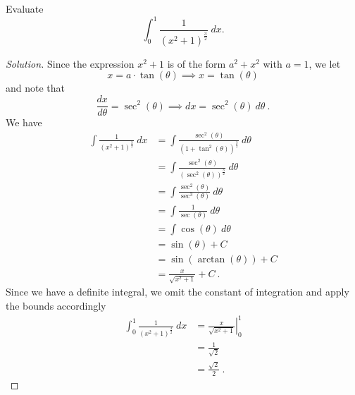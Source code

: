 \documentclass[compacto,10pt,comentarios]{aleph-notas}
\begin{document}
\begin{ejer}
    Evaluate
    $$
        \int_{0}^{1} \frac{1}{(x^{2} + 1)^{\frac{3}{2}}} ~ dx.
    $$
\end{ejer}
\begin{proof}[Solution]
    Since the expression $x^{2} + 1$ is of the form $a^{2} + x^{2}$ with $a = 1$, we let
    $$
        x = a \cdot \tan(\theta) \implies x = \tan(\theta)
    $$
    and note that
    $$
        \frac{dx}{d\theta} = \sec^{2}(\theta) \implies dx = \sec^{2}(\theta) ~ d\theta  ~.
    $$
    We have
    \begin{align*}
        \int \frac{1}{(x^{2} + 1)^{\frac{3}{2}}} ~ dx
        & = \int \frac{\sec^{2}(\theta)}{(1 + \tan^{2}(\theta))^{\frac{3}{2}}} ~ d\theta \\
        & = \int \frac{\sec^{2}(\theta)}{(\sec^{2}(\theta))^{\frac{3}{2}}} ~ d\theta \\
        & = \int \frac{\sec^{2}(\theta)}{\sec^{3}(\theta)} ~ d\theta \\
        & = \int \frac{1}{\sec(\theta)} ~ d\theta \\
        & = \int \cos(\theta) ~ d\theta \\
        & = \sin(\theta) + C \\
        & = \sin(\arctan(\theta)) + C \\
        & = \frac{x}{\sqrt{x^{2} + 1}} + C ~ .
    \end{align*}
    Since we have a definite integral, we omit the constant of integration and apply the bounds accordingly
    \begin{align*}
        \int_{0}^{1} \frac{1}{(x^{2} + 1)^{\frac{3}{2}}} ~ dx 
        & = \left.  \frac{x}{\sqrt{x^{2} + 1}} \right\rvert_{0}^{1} \\
        & = \frac{1}{\sqrt{2}} \\
        & = \frac{\sqrt{2}}{2} ~ .
    \end{align*}
\end{proof}
\end{document}
